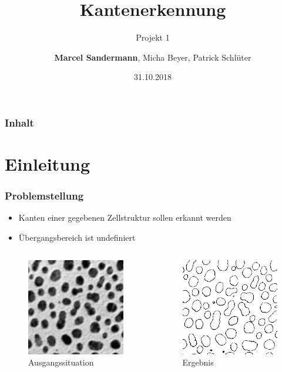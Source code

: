 \documentclass[12pt]{beamer}
\begin{document}
	\author[Gruppe D]{\textbf{Marcel Sandermann}, Micha Beyer, Patrick Schlüter}
	\title{Kantenerkennung}
	\subtitle{Projekt 1}
	\date{31.10.2018}
	\subject{was das}
	
	
\begin{frame}
	\titlepage
\end{frame}

\begin{frame}
	\frametitle{Inhalt}
	\tableofcontents	
\end{frame}

\section{Einleitung}

\begin{frame}
	\frametitle{Problemstellung}
	\begin{itemize}
		\item Kanten einer gegebenen Zellstruktur sollen erkannt werden
		\item Übergangsbereich ist undefiniert		
	\end{itemize}
	\begin{columns}[c]
		\begin{figure}
		\includegraphics[width=0.5\linewidth]{Anfang.png}
		\caption{Ausgangssituation}	
		\end{figure}
		\begin{figure}
			\includegraphics[width=0.5\linewidth]{Ergebnis.png}
			\caption{Ergebnis}
		\end{figure}		 	
	\end{columns}	
\end{frame}
\end{document}
